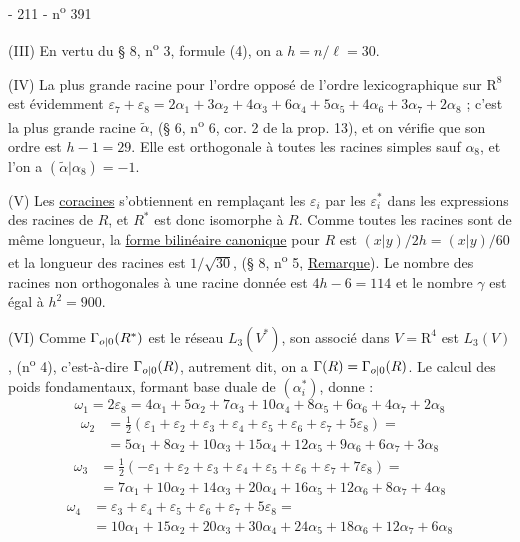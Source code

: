 - 211 - \hfill n\textsuperscript{o} 391

(III) En vertu du § 8, n\textsuperscript{o} 3, formule (4), on a $h=n/\ell=30$.

(IV) La plus grande racine pour l'ordre opposé de l'ordre lexicographique sur $\mathrm{R}^8$ est évidemment $\varepsilon_7+\varepsilon_8=2\alpha_1+3\alpha_2+4\alpha_3+6\alpha_4+5\alpha_5+4\alpha_6+3\alpha_7+2\alpha_8$ ; c'est la plus grande racine $\widetilde\alpha$, (§ 6, n\textsuperscript{o} 6, cor. 2 de la prop. 13), et on vérifie que son ordre est $h-1=29$. Elle est orthogonale à toutes les racines simples sauf $\alpha_8$, et l'on a $(\widetilde\alpha|\alpha_8)=-1$.

(V) Les \uline{coracines} s'obtiennent en remplaçant les $\varepsilon_i$ par les $\varepsilon_i^*$ dans les expressions des racines de $R$, et $R^*$ est donc isomorphe à $R$. Comme toutes les racines sont de même longueur, la \uline{forme bilinéaire canonique} pour $R$ est $(x|y)/2h=(x|y)/60$ et la longueur des racines est $1/\sqrt{30}$, (§ 8, n\textsuperscript{o} 5, \uline{Remarque}). Le nombre des racines non orthogonales à une racine donnée est $4h-6=114$ et le nombre $\gamma$ est égal à $h^2=900$.

(VI) Comme $\Gamma_{\relax{o|0}}(R^*)$ est le réseau $L_3(V^*)$, son associé dans $V=\mathrm{R}^4$ est $L_3(V)$, (n\textsuperscript{o} 4), c'est-à-dire $\Gamma_{\relax{o|0}}(R)$, autrement dit, on a $\Gamma(R)=\Gamma_{\relax{o|0}}(R)$. Le calcul des poids fondamentaux, formant  base duale de $(\alpha_i^*)$, donne :
\[
\omega_1=2\varepsilon_8=4\alpha_1+5\alpha_2+7\alpha_3+10\alpha_4+8\alpha_5+6\alpha_6+4\alpha_7+2\alpha_8
\]
\[
\begin{aligned}
\omega_2&=\frac12(\varepsilon_1+\varepsilon_2+\varepsilon_3+\varepsilon_4+\varepsilon_5+\varepsilon_6+\varepsilon_7+5\varepsilon_8)=\\
&=5\alpha_1+8\alpha_2+10\alpha_3+15\alpha_4+12\alpha_5+9\alpha_6+6\alpha_7+3\alpha_8
\end{aligned}
\]
\[
\begin{aligned}
\omega_3&=\frac12(-\varepsilon_1+\varepsilon_2+\varepsilon_3+\varepsilon_4+\varepsilon_5+\varepsilon_6+\varepsilon_7+7\varepsilon_8)=\\
&=7\alpha_1+10\alpha_2+14\alpha_3+20\alpha_4+16\alpha_5+12\alpha_6+8\alpha_7+4\alpha_8
\end{aligned}
\]
\[
\begin{aligned}
\omega_4&=\varepsilon_3+\varepsilon_4+\varepsilon_5+\varepsilon_6+\varepsilon_7+5\varepsilon_8=\\
&=10\alpha_1+15\alpha_2+20\alpha_3+30\alpha_4+24\alpha_5+18\alpha_6+12\alpha_7+6\alpha_8
\end{aligned}
\]
